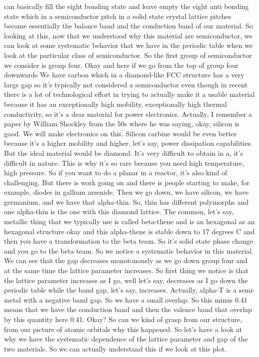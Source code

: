 can basically fill the eight bonding state and leave empty the eight anti bonding state which in a semiconductor pitch in a solid state crystal lattice pitches become essentially the balance band and the conduction band of our material.
So looking at this, now that we understood why this material are semiconductor, we can look at some systematic behavior that we have in the periodic table when we look at the particular class of semiconductor. So the first group of semiconductor we consider is group four. Okay and here if we go from the top of group four downwards We have carbon which in a diamond-like FCC structure has a very large gap so it's typically not considered a semiconductor even though in recent there is a lot of technological effort in trying to actually make it a usable material because it has an exceptionally high mobility, exceptionally high thermal conductivity, so it's a dear material for power electronics. Actually, I remember a paper by William Shockley from the 50s where he was saying, okay, silicon is good. We will make electronics on this. Silicon carbine would be even better because it's a higher mobility and higher, let's say, power dissipation capabilities. But the ideal material would be diamond. It's very difficult to obtain in a, it's difficult in nature. This is why it's so rare because you need high temperature, high pressure. So if you want to do a planar in a reactor, it's also kind of challenging. But there is work going on and there is people starting to make, for example, diodes in gallium arsenide. Then we go down, we have silicon, we have germanium, and we have that alpha-thin. So, thin has different polymorphs and one alpha-thin is the one with this diamond lattice. The common, let's say, metallic thing that we typically use is called beta-thene and is an hexagonal as an hexagonal structure okay and this alpha-thene is stable down to 17 degrees C and then you have a transformation to the beta team. So it's solid state phase change and you go to the beta team. So we notice a systematic behavior in this material. We can see that the gap decreases monotonously as we go down group four and at the same time the lattice parameter increases. So first thing we notice is that the lattice parameter increases as I go, well let's say, decreases as I go down the periodic table while the band gap, let's say, increases. Actually, alpha-T is a semi-metal with a negative band gap. So we have a small overlap. So this minus 0.41 means that we have the conduction band and then the valence band that overlap by this quantity here 0.41. Okay? So can we kind of grasp from our structure, from our picture of atomic orbitals why this happened. So let's have a look at why we have the systematic dependence of the lattice parameter and gap of the two materials. So we can actually understand this if we look at this plot.\\
